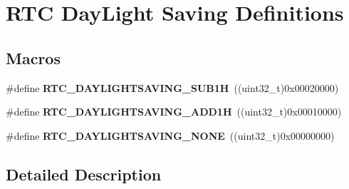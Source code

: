 \hypertarget{group___r_t_c___day_light_saving___definitions}{}\section{R\+TC Day\+Light Saving Definitions}
\label{group___r_t_c___day_light_saving___definitions}
\subsection*{Macros}
\begin{DoxyCompactItemize}
\item 
\#define {\bfseries R\+T\+C\+\_\+\+D\+A\+Y\+L\+I\+G\+H\+T\+S\+A\+V\+I\+N\+G\+\_\+\+S\+U\+B1H}~((uint32\+\_\+t)0x00020000)\hypertarget{group___r_t_c___day_light_saving___definitions_ga7ccaea4cb9cb5fbd21b97dce1e2e887d}{}\label{group___r_t_c___day_light_saving___definitions_ga7ccaea4cb9cb5fbd21b97dce1e2e887d}

\item 
\#define {\bfseries R\+T\+C\+\_\+\+D\+A\+Y\+L\+I\+G\+H\+T\+S\+A\+V\+I\+N\+G\+\_\+\+A\+D\+D1H}~((uint32\+\_\+t)0x00010000)\hypertarget{group___r_t_c___day_light_saving___definitions_gabd374c3ce0fb1b3ec96a3a71155151ae}{}\label{group___r_t_c___day_light_saving___definitions_gabd374c3ce0fb1b3ec96a3a71155151ae}

\item 
\#define {\bfseries R\+T\+C\+\_\+\+D\+A\+Y\+L\+I\+G\+H\+T\+S\+A\+V\+I\+N\+G\+\_\+\+N\+O\+NE}~((uint32\+\_\+t)0x00000000)\hypertarget{group___r_t_c___day_light_saving___definitions_gafef31f6f6d924dededc4589d2dd16a5c}{}\label{group___r_t_c___day_light_saving___definitions_gafef31f6f6d924dededc4589d2dd16a5c}

\end{DoxyCompactItemize}


\subsection{Detailed Description}
